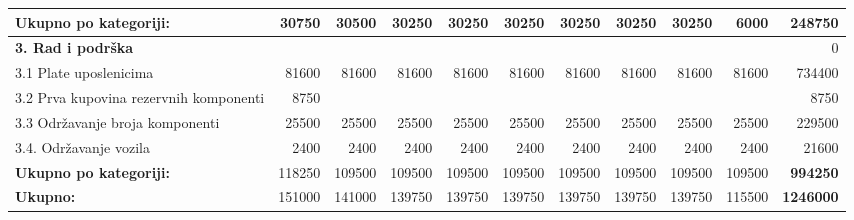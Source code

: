 \documentclass[12pt]{article}
\begin{document}
\begin{landscape}
\begin{table}[htbp]
\begin{tabular}{lrrrrrrrrrr}
    \textbf{Ukupno po kategoriji:} & 30750 & 30500 & 30250 & 30250 & 30250 & 30250 & 30250 & 30250 & 6000  & \textbf{248750} \\
    \midrule
    \textbf{3. Rad i podrška} &       &       &       &       &       &       &       &       &       & 0 \\
    3.1 Plate uposlenicima & 81600 & 81600 & 81600 & 81600 & 81600 & 81600 & 81600 & 81600 & 81600 & 734400 \\
    \multicolumn{1}{p{14.715em}}{3.2 Prva kupovina rezervnih\newline{} komponenti} & 8750  &       &       &       &       &       &       &       &       & 8750 \\
    3.3 Održavanje broja komponenti & 25500 & 25500 & 25500 & 25500 & 25500 & 25500 & 25500 & 25500 & 25500 & 229500 \\
    3.4. Održavanje vozila & 2400  & 2400  & 2400  & 2400  & 2400  & 2400  & 2400  & 2400  & 2400  & 21600 \\
    \midrule
    \textbf{Ukupno po kategoriji:} & 118250 & 109500 & 109500 & 109500 & 109500 & 109500 & 109500 & 109500 & 109500 & \textbf{994250} \\
    \midrule
    \textbf{Ukupno:} & 151000 & 141000 & 139750 & 139750 & 139750 & 139750 & 139750 & 139750 & 115500 & \textbf{1246000} \\
    \bottomrule
    \end{tabular}%
  \label{tab:addlabel}%
\end{table}%

\end{landscape}
\end{document}
